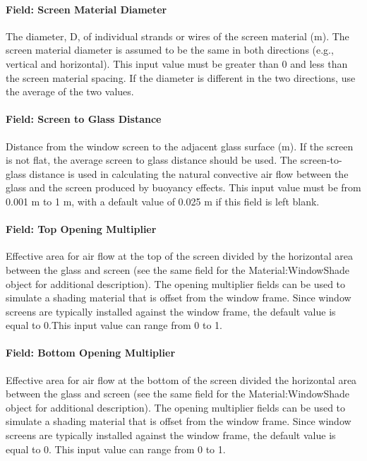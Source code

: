 \paragraph{Field: Screen Material Diameter}\label{field-screen-material-diameter}

The diameter, D, of individual strands or wires of the screen material (m). The screen material diameter is assumed to be the same in both directions (e.g., vertical and horizontal). This input value must be greater than 0 and less than the screen material spacing. If the diameter is different in the two directions, use the average of the two values.

\paragraph{Field: Screen to Glass Distance}\label{field-screen-to-glass-distance}

Distance from the window screen to the adjacent glass surface (m). If the screen is not flat, the average screen to glass distance should be used. The screen-to-glass distance is used in calculating the natural convective air flow between the glass and the screen produced by buoyancy effects. This input value must be from 0.001 m to 1 m, with a default value of 0.025 m if this field is left blank.

\paragraph{Field: Top Opening Multiplier}\label{field-top-opening-multiplier-2}

Effective area for air flow at the top of the screen divided by the horizontal area between the glass and screen (see the same field for the Material:WindowShade object for additional description). The opening multiplier fields can be used to simulate a shading material that is offset from the window frame. Since window screens are typically installed against the window frame, the default value is equal to 0.This input value can range from 0 to 1.

\paragraph{Field: Bottom Opening Multiplier}\label{field-bottom-opening-multiplier-2}

Effective area for air flow at the bottom of the screen divided the horizontal area between the glass and screen (see the same field for the Material:WindowShade object for additional description). The opening multiplier fields can be used to simulate a shading material that is offset from the window frame. Since window screens are typically installed against the window frame, the default value is equal to 0. This input value can range from 0 to 1.

